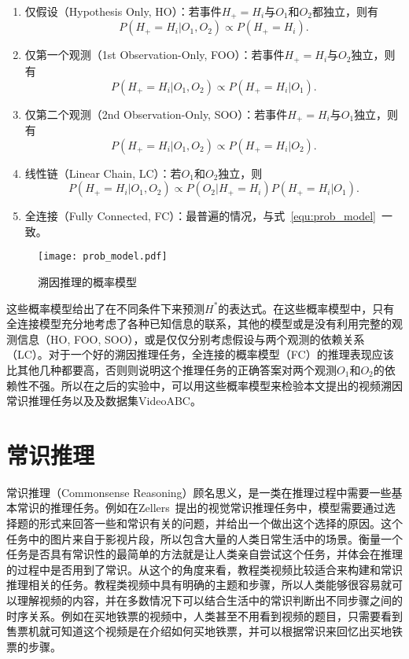 \begin{enumerate}
    \item 仅假设（Hypothesis Only, HO）：若事件$H_+=H_i$与$O_1$和$O_2$都独立，则有
    \begin{equation}
        P(H_+=H_i | O_{1}, O_{2})\propto  P(H_+=H_i).
    \end{equation}
    \item 仅第一个观测（1st Observation-Only, FOO）：若事件$H_+=H_i$与$O_2$独立，则有
    \begin{equation}
        P(H_+=H_i | O_{1}, O_{2})\propto  P(H_+=H_i|O_1).
    \end{equation}
    \item 仅第二个观测（2nd Observation-Only, SOO）：若事件$H_+=H_i$与$O_1$独立，则有
    \begin{equation}
        P(H_+=H_i | O_{1}, O_{2})\propto  P(H_+=H_i|O_2).
    \end{equation}
    \item 线性链（Linear Chain, LC）：若$O_1$和$O_2$独立，则
    \begin{equation}
        P(H_+=H_i | O_{1}, O_{2})\propto  P(O_2|H_+=H_i)P(H_+=H_i|O_1).
    \end{equation}
    \item 全连接（Fully Connected, FC）：最普遍的情况，与式~\eqref{equ:prob_model}~一致。
\end{enumerate}
\begin{figure}[t]
    \centering
    \texttt{[image: prob\_model.pdf]}
    \caption{溯因推理的概率模型}
    \label{fig:prob_model}
\end{figure}
这些概率模型给出了在不同条件下来预测$H^*$的表达式。在这些概率模型中，只有全连接模型充分地考虑了各种已知信息的联系，其他的模型或是没有利用完整的观测信息（HO, FOO, SOO），或是仅仅分别考虑假设与两个观测的依赖关系（LC）。对于一个好的溯因推理任务，全连接的概率模型（FC）的推理表现应该比其他几种都要高，否则则说明这个推理任务的正确答案对两个观测$O_1$和$O_2$的依赖性不强。所以在之后的实验中，可以用这些概率模型来检验本文提出的视频溯因常识推理任务以及及数据集VideoABC。

\section{常识推理}\label{sec:commonsense}
常识推理（Commonsense Reasoning）顾名思义，是一类在推理过程中需要一些基本常识的推理任务。例如在Zellers~\etal 提出的视觉常识推理\cite{zellers2019recognition}任务中，模型需要通过选择题的形式来回答一些和常识有关的问题，并给出一个做出这个选择的原因。这个任务中的图片来自于影视片段，所以包含大量的人类日常生活中的场景。衡量一个任务是否具有常识性的最简单的方法就是让人类亲自尝试这个任务，并体会在推理的过程中是否用到了常识。从这个的角度来看，教程类视频比较适合来构建和常识推理相关的任务。教程类视频中具有明确的主题和步骤，所以人类能够很容易就可以理解视频的内容，并在多数情况下可以结合生活中的常识判断出不同步骤之间的时序关系。例如在买地铁票的视频中，人类甚至不用看到视频的题目，只需要看到售票机就可知道这个视频是在介绍如何买地铁票，并可以根据常识来回忆出买地铁票的步骤。

